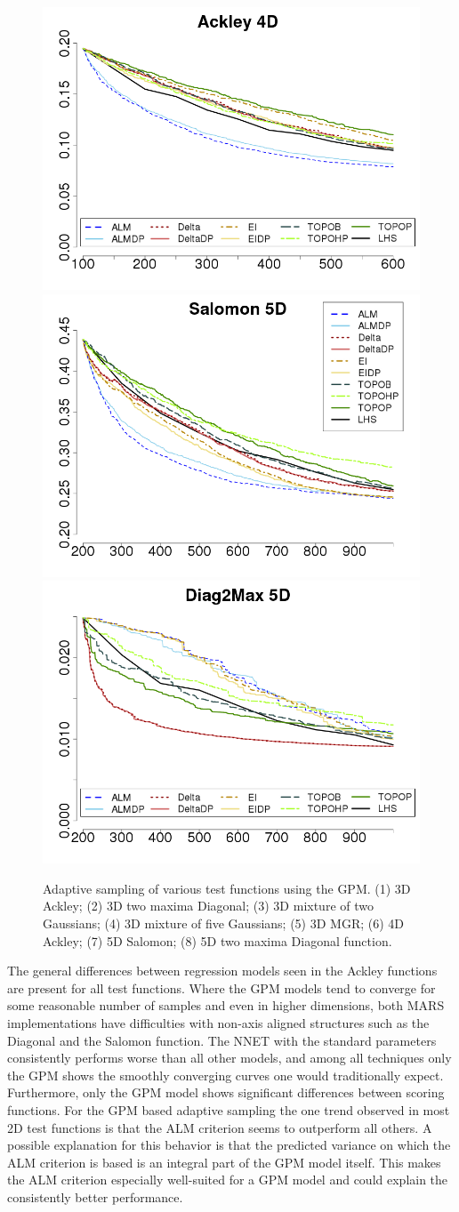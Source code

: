 \begin{figure}[htbp]
\begin{center}
 \includegraphics[width=0.24\linewidth]{figs/chap5/gpm_Ackley_td=100}\label{fig:ackley4D_gpm}
 \includegraphics[width=0.24\linewidth]{figs/chap5/gpm_Salomon_td=200}\label{fig:salomon5D_gpm}
 \includegraphics[width=0.24\linewidth]{figs/chap5/gpm_Diag2Max_5D_td=200}\label{fig:2diag5D_gpm}
\caption{Adaptive sampling of various test functions using the GPM.
%
(1)  3D Ackley;
(2) 3D two maxima Diagonal;
(3) 3D mixture of two Gaussians;
(4) 3D mixture of five Gaussians;
(5) 3D MGR;
(6) 4D Ackley;
(7) 5D Salomon;
(8) 5D two maxima Diagonal function.}
\label{fig:345D_gpm}
\end{center}
\end{figure}

The general differences between regression models seen in the Ackley functions are present for all test functions.
%
Where the GPM models tend to converge for some reasonable number of samples and even in higher dimensions, both MARS implementations have difficulties with non-axis aligned structures such as the Diagonal and the Salomon function.
%
The NNET with the standard parameters consistently performs worse than all other models, and among all techniques only the GPM shows the smoothly converging curves one would traditionally expect.
%
Furthermore, only the GPM model shows significant differences between scoring functions.
%
For the GPM based adaptive sampling the one trend observed in most 2D test functions is that the ALM criterion seems to outperform all others.
%
A possible explanation for this behavior is that the predicted variance on which the ALM criterion is based is an integral part of the GPM model itself.
%
This makes the ALM criterion especially well-suited for a GPM model and could explain the consistently better performance.

